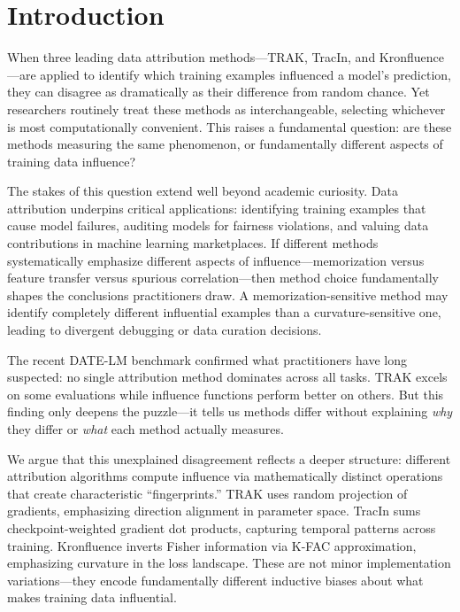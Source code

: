 \section{Introduction}

When three leading data attribution methods---TRAK, TracIn, and Kronfluence---are applied to identify which training examples influenced a model's prediction, they can disagree as dramatically as their difference from random chance. Yet researchers routinely treat these methods as interchangeable, selecting whichever is most computationally convenient. This raises a fundamental question: are these methods measuring the same phenomenon, or fundamentally different aspects of training data influence?

The stakes of this question extend well beyond academic curiosity. Data attribution underpins critical applications: identifying training examples that cause model failures, auditing models for fairness violations, and valuing data contributions in machine learning marketplaces. If different methods systematically emphasize different aspects of influence---memorization versus feature transfer versus spurious correlation---then method choice fundamentally shapes the conclusions practitioners draw. A memorization-sensitive method may identify completely different influential examples than a curvature-sensitive one, leading to divergent debugging or data curation decisions.

The recent DATE-LM benchmark \cite{jiao2025datelm} confirmed what practitioners have long suspected: no single attribution method dominates across all tasks. TRAK excels on some evaluations while influence functions perform better on others. But this finding only deepens the puzzle---it tells us methods differ without explaining \emph{why} they differ or \emph{what} each method actually measures.

We argue that this unexplained disagreement reflects a deeper structure: different attribution algorithms compute influence via mathematically distinct operations that create characteristic ``fingerprints.'' TRAK uses random projection of gradients, emphasizing direction alignment in parameter space. TracIn sums checkpoint-weighted gradient dot products, capturing temporal patterns across training. Kronfluence inverts Fisher information via K-FAC approximation, emphasizing curvature in the loss landscape. These are not minor implementation variations---they encode fundamentally different inductive biases about what makes training data influential.

